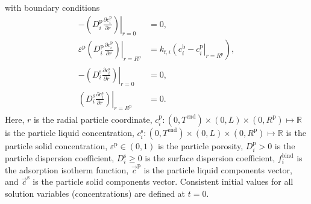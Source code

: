 \documentclass{article}
\begin{document}
with boundary conditions
\begin{align}
- \left. \left( D^{\mathrm{p}}_{i} \frac{\partial c^{\mathrm{p}}_{i}}{\partial r} \right) \right|_{r=0}
&= 0, \\
\varepsilon^{\mathrm{p}} \left. \left( D^{\mathrm{p}}_{i} \frac{\partial c^{\mathrm{p}}_{i}}{\partial r} \right)\right|_{r = R^{\mathrm{p}}_{}}
               &= k_{\mathrm{f},i} \left. \left( c^{\mathrm{b}}_i - c^{\mathrm{p}}_{i} \right|_{r = R^{\mathrm{p}}_{}} \right),\\
-\left( \left. D^{\mathrm{s}}_{i} \frac{\partial c^{\mathrm{s}}_{i}}{\partial r} \right) \right|_{r=0}
&= 0, \\
\left( \left. D^{\mathrm{s}}_{i} \frac{\partial c^{\mathrm{s}}_{i}}{\partial r} \right) \right|_{r = R^{\mathrm{p}}_{}}
&= 0.
\end{align}
Here, $r$ is the radial particle coordinate, $c^\mathrm{p}_i\colon  (0, T^\mathrm{end}) \times (0, L)\times (0, R^{\mathrm{p}}) \mapsto \mathbb{R}$ is the particle liquid concentration, $c^\mathrm{s}_i\colon  (0, T^\mathrm{end}) \times (0, L)\times (0, R^{\mathrm{p}}) \mapsto \mathbb{R}$ is the particle solid concentration, $\varepsilon^\mathrm{p}\in (0, 1)$ is the particle porosity, $D^\mathrm{p}_i> 0$ is the particle dispersion coefficient, $D^\mathrm{s}_i\geq 0$ is the surface dispersion coefficient, $f^\mathrm{bind}_i$ is the adsorption isotherm function, $\vec{c}^\mathrm{p}$ is the particle liquid components vector, and $\vec{c}^\mathrm{s}$ is the particle solid components vector.
Consistent initial values for all solution variables (concentrations) are defined at $t = 0$.
\end{document}
